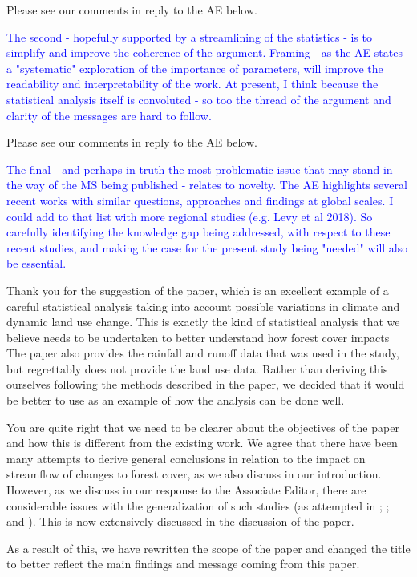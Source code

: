 \documentclass[]{elsarticle} %
\begin{document}
Please see our comments in reply to the AE below.

\textcolor{blue}{The second - hopefully supported by a streamlining of the statistics - is to simplify and improve the coherence of the argument.  Framing - as the AE states - a "systematic" exploration of the importance of parameters, will improve the readability and interpretability of the work.  At present, I think because the statistical analysis itself is convoluted - so too the thread of the argument and clarity of the messages are hard to follow.}

Please see our comments in reply to the AE below.

\textcolor{blue}{The final - and perhaps in truth the most problematic issue that may stand in the way of the MS being published - relates to novelty.  The AE highlights several recent works with similar questions, approaches and findings at global scales.  I could add to that list with more regional studies (e.g. Levy et al 2018).  So carefully identifying the knowledge gap being addressed, with respect to these recent studies, and making the case for the present study being "needed" will also be essential.}

Thank you for the suggestion of the \citet{levy2018} paper, which is an excellent example of a careful statistical analysis taking into account possible variations in climate and dynamic land use change. This is exactly the kind of statistical analysis that we believe needs to be undertaken to better understand how forest cover impacts The paper also provides the rainfall and runoff data that was used in the study, but regrettably does not provide the land use data. Rather than deriving this ourselves following the methods described in the paper, we decided that it would be better to use \citet{levy2018} as an example of how the analysis can be done well.

You are quite right that we need to be clearer about the objectives of the paper and how this is different from the existing work. We agree that there have been many attempts to derive general conclusions in relation to the impact on streamflow of changes to forest cover, as we also discuss in our introduction. However, as we discuss in our response to the Associate Editor, there are considerable issues with the generalization of such studies (as attempted in \citet{zhou2015}; \citet{jackson2005}; \citet{filoso2017} and \citet{zhang2017}). This is now extensively discussed in the discussion of the paper.

As a result of this, we have rewritten the scope of the paper and changed the title to better reflect the main findings and message coming from this paper.
\end{document}

